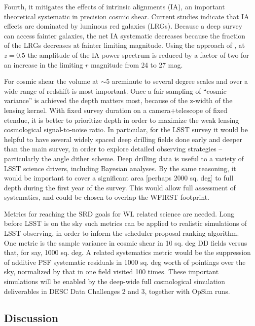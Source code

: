 Fourth, it mitigates the effects of intrinsic alignments (IA), an important
theoretical systematic in precision cosmic shear.  Current studies
\citep{Heymans2013} indicate that IA effects are dominated by luminous red
galaxies (LRGs).  Because a deep survey can access fainter galaxies, the net IA
systematic decreases because the fraction of the LRGs decreases at fainter
limiting magnitude.  Using the approach of \citet{Joachimi2011}, at $z = 0.5$
the amplitude of the IA power spectrum is reduced by a factor of two for an
increase in the limiting $r$ magnitude from 24 to 27 mag.

For cosmic shear the volume at $\sim 5$ arcminute to several degree scales and
over a wide range of redshift is most important.  Once a fair sampling of
“cosmic variance” is achieved the depth matters most, because of the z-width of
the lensing kernel.  With fixed survey duration on a camera+telescope of fixed
etendue, it is better to prioritize depth in order to maximize the weak lensing
cosmological signal-to-noise ratio.  In particular, for the LSST survey it would
be helpful to have several widely spaced deep drilling fields done early and
deeper than the main survey, in order to explore detailed observing strategies --
particularly the angle dither scheme.  Deep drilling data is useful to a variety
of LSST science drivers, including Bayesian analyses.  By the same reasoning, it
would be important to cover a significant area [perhaps 2000 sq. deg] to full
depth during the first year of the survey.  This would allow full assessment of
systematics, and could be chosen to overlap the WFIRST footprint.

Metrics for reaching the SRD goals for WL related science are needed. Long
before LSST is on the sky such metrics can be applied to realistic simulations
of LSST observing, in order to inform the scheduler proposal ranking algorithm.
One metric is the sample variance in cosmic shear in 10 sq. deg DD fields versus
that, for say, 1000 sq. deg.  A related systematics metric would be the
suppression of additive PSF systematic residuals in 1000 sq. deg worth of
pointings over the sky, normalized by that in one field visited 100 times. These
important simulations will be enabled by the deep-wide full cosmological
simulation deliverables in DESC Data Challenges 2 and 3, together with OpSim
runs.


\subsection{Discussion}

